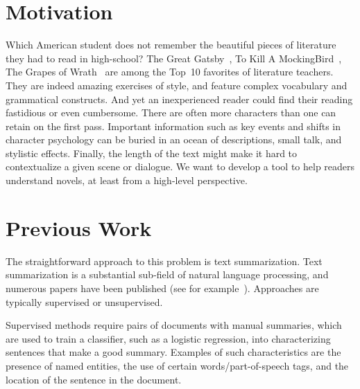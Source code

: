 \documentclass[twoside]{article}
\begin{document}
\begin{multicols}{2} %

\section{Motivation}

\lettrine[nindent=0em,lines=3]{W}{}hich American student does not remember the beautiful pieces of literature they had to read in high-school? The Great Gatsby~\cite{fitzgerald1925great}, To Kill A MockingBird~\cite{lee2010kill}, The Grapes of Wrath~\cite{steinbeck2006grapes} are among the Top~10 favorites of literature teachers. They are indeed amazing exercises of style, and feature complex vocabulary and grammatical constructs. And yet an inexperienced reader could find their reading fastidious or even cumbersome. There are often more characters than one can retain on the first pass. Important information such as key events and shifts in character psychology can be buried in an ocean of descriptions, small talk, and stylistic effects. Finally, the length of the text might make it hard to contextualize a given scene or dialogue. We want to develop a tool to help readers understand novels, at least from a high-level perspective.


\section{Previous Work}

The straightforward approach to this problem is text summarization. Text summarization is a substantial sub-field of natural language processing, and numerous papers have been published (see for example~\cite{nenkova2012survey, gupta2010survey, das2007survey}). Approaches are typically supervised or unsupervised. 

Supervised methods require pairs of documents with manual summaries, which are used to train a classifier, such as a logistic regression, into characterizing sentences that make a good summary. Examples of such characteristics are the presence of named entities, the use of certain words/part-of-speech tags, and the location of the sentence in the document. 


\end{multicols}
\end{document}
